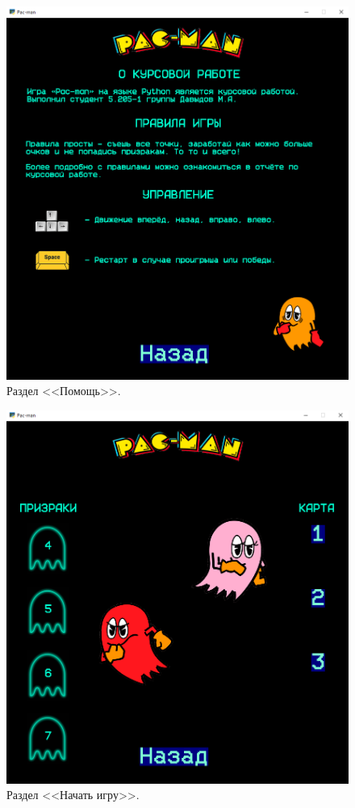 \documentclass[14pt, oneside]{altsu-report}
\begin{document}
\begin{figure}[H]
	\centering
	\includegraphics[width=1\linewidth]{images/2.png}
	\caption{Раздел <<Помощь>>.}
	\label{fig3}
\end{figure}

\begin{figure}[H]
	\centering
	\includegraphics[width=1\linewidth]{images/3.png}
	\caption{Раздел <<Начать игру>>.}
	\label{fig4}
\end{figure}
\end{document}
